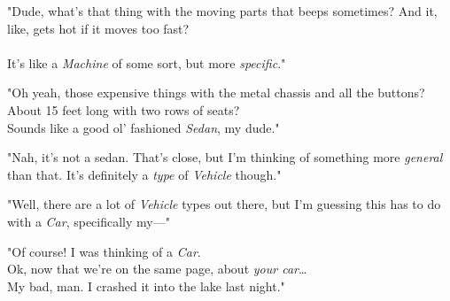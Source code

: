 \begin{addmargin}[8em]{2em}
\begin{flushright}
"Dude, what's that thing with the moving parts that beeps sometimes? And it, like, gets hot if it moves too fast? \\[1mm]

\mydots \\[1mm]

It's like a \textit{Machine} of some sort, but more \textit{specific}." \\[\baselineskip]
\end{flushright}
\end{addmargin}

\begin{addmargin}[2em]{8em}
"Oh yeah, those expensive things with the metal chassis and all the buttons? About 15 feet long with two rows of seats? \\[2mm]
Sounds like a good ol' fashioned \textit{Sedan}, my dude." \\
\end{addmargin}

\begin{addmargin}[8em]{2em}
	\begin{flushright}
		"Nah, it's not a sedan. That's close, but I'm thinking of something more \textit{general} than that. It's definitely a \textit{type} of \textit{Vehicle} though." \\[\baselineskip]
	\end{flushright}
\end{addmargin}

\begin{addmargin}[2em]{8em}
	"Well, there are a lot of \textit{Vehicle} types out there, but I'm guessing this has to do with a \textit{Car}, specifically my---" \\
\end{addmargin}

\begin{addmargin}[8em]{2em}
	\begin{flushright}
		"Of course! I was thinking of a \textit{Car}. \\[2mm]
		Ok, now that we're on the same page, about \textit{your car}\dots \\
		My bad, man. I crashed it into the lake last night." \\[\baselineskip]
	\end{flushright}
\end{addmargin}

\begin{addmargin}[2em]{8em}
	\mydots \\
\end{addmargin}

